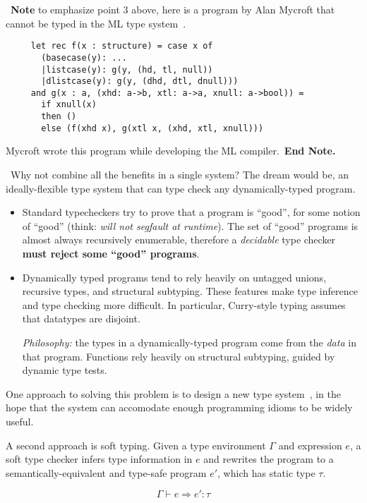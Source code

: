 \documentclass{article}
\begin{document}
\noindent \textxswdown~\textbf{Note} to emphasize point 3 above, here is a program by
Alan Mycroft that cannot be typed in the ML type system~\cite{m-icop-1984}.

\begin{verbatim}
     let rec f(x : structure) = case x of
       (basecase(y): ...
       |listcase(y): g(y, (hd, tl, null))
       |dlistcase(y): g(y, (dhd, dtl, dnull)))
     and g(x : a, (xhd: a->b, xtl: a->a, xnull: a->bool)) =
       if xnull(x)
       then ()
       else (f(xhd x), g(xtl x, (xhd, xtl, xnull)))
\end{verbatim}

Mycroft wrote this program while developing the ML compiler.~\textbf{End Note.}

\noindent \danger~Why not combine all the benefits in a single system?
The dream would be, an ideally-flexible type system that can type check any
dynamically-typed program.
\begin{itemize}
\item
  Standard typecheckers try to prove that a program is ``good'', for some
   notion of ``good'' (think: \emph{will not segfault at runtime}).
  The set of ``good'' programs is almost always recursively enumerable,
   therefore a \emph{decidable} type checker \textbf{must reject some ``good'' programs}.
\item
  Dynamically typed programs tend to rely heavily on untagged unions, recursive
   types, and structural subtyping.
  These features make type inference and type checking more difficult.
  In particular, Curry-style typing assumes that datatypes are disjoint.

  \emph{Philosophy:} the types in a dynamically-typed program come from the
  \emph{data} in that program.
  Functions rely heavily on structural subtyping, guided by dynamic type tests.
\end{itemize}

One approach to solving this problem is to design a new type system~\cite{m-icop-1984},
 in the hope that the system can accomodate enough programming idioms to be
 widely useful.

A second approach is soft typing.
Given a type environment $\Gamma$ and expression $e$, a soft type checker
 infers type information in $e$ and rewrites the program to a
 semantically-equivalent and type-safe program $e'$, which has static type $\tau$.

$$ \Gamma \vdash e \Rightarrow e' : \tau $$
\end{document}
